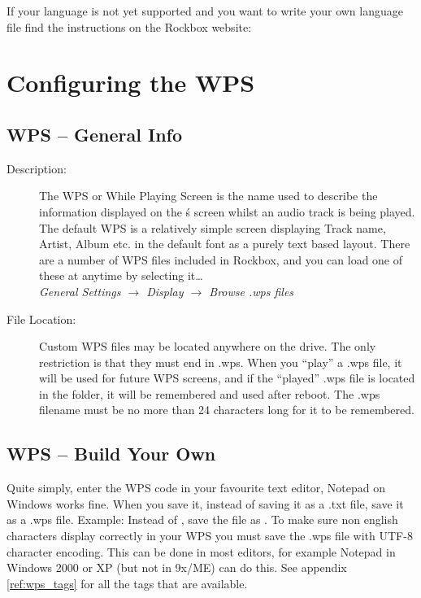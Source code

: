If your language is not yet supported and you want to write your own language
file find the instructions on the Rockbox website:

\section{\label{ref:ConfiguringtheWPS}Configuring the WPS}

\subsection{WPS -- General Info}

\begin{description}
\item[Description: ] The WPS or While Playing Screen is the name used to describe 
the information displayed on the \dap\'s screen whilst an audio track is
being played. The default WPS is a relatively simple screen displaying
Track name, Artist, Album etc. in the default font as a purely text based
layout. There are a number of WPS files included in Rockbox, and you can 
load one of these at anytime by selecting it\dots\\
\emph{General Settings $\rightarrow$ Display $\rightarrow$ Browse .wps files}\\


\item [File Location: ]Custom WPS files may be located anywhere on the drive. 
The only restriction is that they must end in .wps. When you ``play'' a .wps 
file, it will be used for future WPS screens, and if the ``played'' .wps file is 
located in the  folder, it will be remembered and used after 
reboot. The .wps filename must be no more than 24 characters long for it to be
remembered.
\end{description}

\subsection{\label{ref:CreateYourOwnWPS}WPS -- Build Your Own}
Quite simply, enter the WPS code in your favourite text editor, Notepad on
Windows works fine. When you save it, instead of saving it as a .txt file, save
it as a .wps file. Example: Instead of , save the file as
. To make sure non english characters display correctly in
your WPS you must save the .wps file with UTF-8 character encoding. This can be
done in most editors, for example Notepad in Windows 2000 or XP (but not in
9x/ME) can do this. See appendix \ref{ref:wps_tags} for all the tags that are
available.

